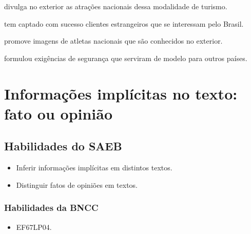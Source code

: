 \begin{escolha}

  \item divulga no exterior as atrações nacionais dessa modalidade de turismo.

  \item tem captado com sucesso clientes estrangeiros que se interessam pelo Brasil.

  \item promove imagens de atletas nacionais que são conhecidos no exterior.

  \item formulou exigências de segurança que serviram de modelo para outros países.

\end{escolha}


\chapter{Informações implícitas no texto: fato ou opinião}

\section*{Habilidades do SAEB}

\begin{itemize} 

  \item Inferir informações implícitas em distintos textos.

  \item Distinguir fatos de opiniões em textos.

\end{itemize}

\subsection{Habilidades da BNCC}

\begin{itemize} 

  \item EF67LP04.

\end{itemize} 

